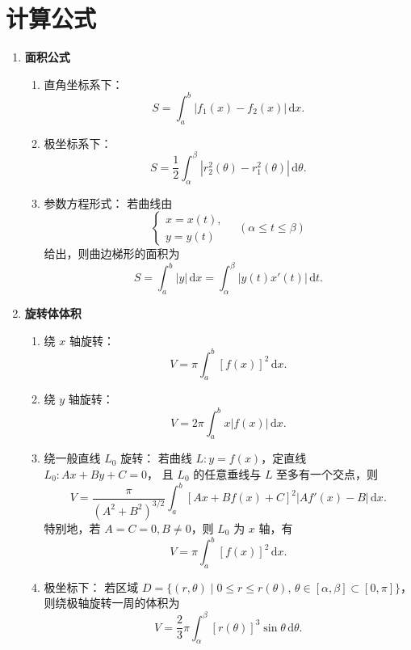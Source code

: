 \section{计算公式}

\begin{enumerate}
    \item \textbf{面积公式}
          \begin{enumerate}
              \item 直角坐标系下：
                    $$S = \int_{a}^{b} |f_{1}(x) - f_{2}(x)| \, \mathrm{d}x.$$
              \item 极坐标系下：
                    $$S = \frac{1}{2} \int_{\alpha}^{\beta} \left| r_{2}^{2}(\theta) - r_{1}^{2}(\theta) \right| \, \mathrm{d}\theta.$$
              \item 参数方程形式：
                    若曲线由
                    $$\begin{cases}
                            x = x(t), \\
                            y = y(t)
                        \end{cases}
                        \quad (\alpha \leqslant t \leqslant \beta)
                    $$
                    给出，则曲边梯形的面积为
                    $$
                        S = \int_{a}^{b} |y| \, \mathrm{d}x
                        = \int_{\alpha}^{\beta} |y(t) x'(t)| \, \mathrm{d}t.
                    $$
          \end{enumerate}

    \item \textbf{旋转体体积}
          \begin{enumerate}
              \item 绕 $x$ 轴旋转：
                    $$
                        V = \pi \int_{a}^{b} [f(x)]^{2} \, \mathrm{d}x.
                    $$
              \item 绕 $y$ 轴旋转：
                    $$
                        V = 2\pi \int_{a}^{b} x |f(x)| \, \mathrm{d}x.
                    $$
              \item 绕一般直线 $L_{0}$ 旋转：
                    若曲线 $L: y = f(x)$，定直线 $L_{0}: Ax + By + C = 0$，
                    且 $L_{0}$ 的任意垂线与 $L$ 至多有一个交点，则
                    $$
                        V = \frac{\pi}{(A^{2} + B^{2})^{3/2}}
                        \int_{a}^{b} [A x + B f(x) + C]^{2} |A f'(x) - B| \, \mathrm{d}x.
                    $$
                    特别地，若 $A = C = 0, B \neq 0$，则 $L_{0}$ 为 $x$ 轴，有
                    $$
                        V = \pi \int_{a}^{b} [f(x)]^{2} \, \mathrm{d}x.
                    $$
              \item 极坐标下：
                    若区域
                    $D = \{ (r, \theta) \mid 0 \le r \le r(\theta),\, \theta \in [\alpha, \beta] \subset [0, \pi] \}$，
                    则绕极轴旋转一周的体积为
                    $$
                        V = \frac{2}{3}\pi \int_{\alpha}^{\beta} [r(\theta)]^{3} \sin\theta \, \mathrm{d}\theta.
                    $$
          \end{enumerate}


\end{enumerate}
